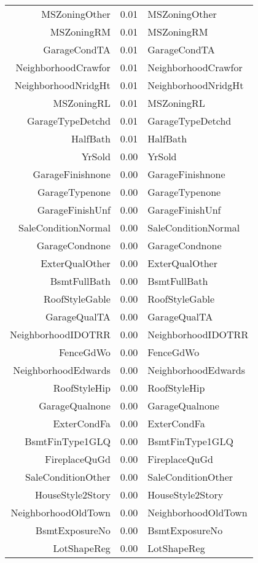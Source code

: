 \begin{table}[ht]
\begin{tabular}{rrl}
  MSZoningOther & 0.01 & MSZoningOther \\ 
  MSZoningRM & 0.01 & MSZoningRM \\ 
  GarageCondTA & 0.01 & GarageCondTA \\ 
  NeighborhoodCrawfor & 0.01 & NeighborhoodCrawfor \\ 
  NeighborhoodNridgHt & 0.01 & NeighborhoodNridgHt \\ 
  MSZoningRL & 0.01 & MSZoningRL \\ 
  GarageTypeDetchd & 0.01 & GarageTypeDetchd \\ 
  HalfBath & 0.01 & HalfBath \\ 
  YrSold & 0.00 & YrSold \\ 
  GarageFinishnone & 0.00 & GarageFinishnone \\ 
  GarageTypenone & 0.00 & GarageTypenone \\ 
  GarageFinishUnf & 0.00 & GarageFinishUnf \\ 
  SaleConditionNormal & 0.00 & SaleConditionNormal \\ 
  GarageCondnone & 0.00 & GarageCondnone \\ 
  ExterQualOther & 0.00 & ExterQualOther \\ 
  BsmtFullBath & 0.00 & BsmtFullBath \\ 
  RoofStyleGable & 0.00 & RoofStyleGable \\ 
  GarageQualTA & 0.00 & GarageQualTA \\ 
  NeighborhoodIDOTRR & 0.00 & NeighborhoodIDOTRR \\ 
  FenceGdWo & 0.00 & FenceGdWo \\ 
  NeighborhoodEdwards & 0.00 & NeighborhoodEdwards \\ 
  RoofStyleHip & 0.00 & RoofStyleHip \\ 
  GarageQualnone & 0.00 & GarageQualnone \\ 
  ExterCondFa & 0.00 & ExterCondFa \\ 
  BsmtFinType1GLQ & 0.00 & BsmtFinType1GLQ \\ 
  FireplaceQuGd & 0.00 & FireplaceQuGd \\ 
  SaleConditionOther & 0.00 & SaleConditionOther \\ 
  HouseStyle2Story & 0.00 & HouseStyle2Story \\ 
  NeighborhoodOldTown & 0.00 & NeighborhoodOldTown \\ 
  BsmtExposureNo & 0.00 & BsmtExposureNo \\ 
  LotShapeReg & 0.00 & LotShapeReg \\ 

\end{tabular}
\end{table}
